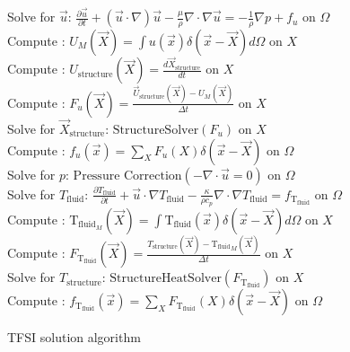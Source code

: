 \documentclass[10pt]{article} %
\begin{document}
\begin{algorithm}[H]
	\SetAlgoLined
	{
		{
			Solve for $\vec{u}$: $\frac{\partial \vec{u}}{\partial t} + (\vec{u} \cdot \nabla) \vec{u} - \frac{\mu}{\rho} \nabla \cdot \nabla \vec{u} = - \frac{1}{\rho} \nabla p + f_u$ \quad on $\Omega$\\
			Compute : $U_M (\vec{X}) = \int u(\vec{x}) \delta(\vec{x}-\vec{X}) d \Omega$ \quad on $X$\\
			Compute : $U_{\text{structure}} (\vec{X}) = \frac{d \vec{X}_{\text{structure}}}{dt}$ \quad on $X$\\
			Compute : $F_u (\vec{X}) = \frac{\vec{U}_\text{structure} (\vec{X}) - U_M(\vec{X})}{\Delta t}$ \quad on $X$\\
			Solve for $\vec{X}_\text{structure}$: $\text{StructureSolver}(F_u)$ \quad on $X$\\
			Compute : $f_u (\vec{x}) = \sum_{X} F_u (X) \delta (\vec{x}-\vec{X})$ \quad on $\Omega$\\
			Solve for $p$: $\text{Pressure Correction}(- \nabla \cdot \vec{u} = 0)$ \quad on $\Omega$\\
		}
		{
			Solve for $T_{\text{fluid}}$: $\frac{\partial T_{\text{fluid}}}{\partial t} + \vec{u} \cdot \nabla T_{\text{fluid}} - \frac{\kappa}{\rho c_p} \nabla \cdot \nabla T_{\text{fluid}} = f_{\text{T}_{\text{fluid}}}$ \quad on $\Omega$\\
			Compute : $\text{T}_{\text{fluid}_M} (\vec{X}) = \int {\text{T}_{\text{fluid}}}(\vec{x}) \delta(\vec{x}-\vec{X}) d \Omega$  \quad on $X$\\
			Compute : $F_{\text{T}_{\text{fluid}}} (\vec{X}) = \frac{T_{\text{structure}} (\vec{X}) - {\text{T}_{\text{fluid}}}_M(\vec{X})}{\Delta t}$ \quad on $X$\\
			Solve for $T_\text{structure}$: $\text{StructureHeatSolver}(F_{\text{T}_{\text{fluid}}})$ \quad on $X$\\
			Compute : $f_{\text{T}_{\text{fluid}}} (\vec{x}) = \sum_{X} F_{\text{T}_{\text{fluid}}} (X) \delta (\vec{x}-\vec{X})$ \quad on $\Omega$\\
		}
	}
	\caption{TFSI solution algorithm}
\end{algorithm}
\end{document}
